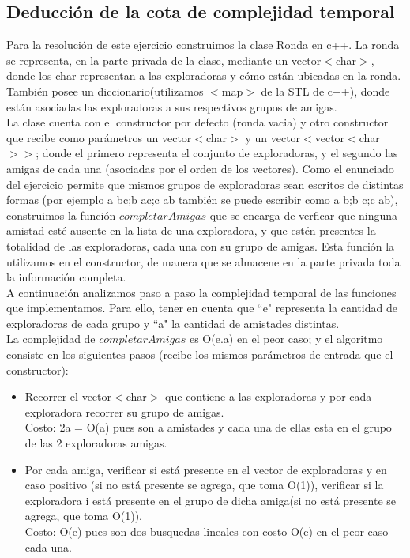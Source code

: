 \subsection{Deducción de la cota de complejidad temporal}

Para la resolución de este ejercicio construimos la clase Ronda en c++. La ronda se representa, en la parte privada de la clase,
mediante un vector$<$char$>$, donde los char representan a las exploradoras y cómo están ubicadas en la ronda. También posee un 
diccionario(utilizamos $<$map$>$ de la STL de c++), donde están asociadas las exploradoras a sus respectivos grupos de amigas. \\
La clase cuenta con el constructor por defecto (ronda vacia) y otro constructor que recibe como parámetros un vector$<$char$>$ y un
vector$<$vector$<$char$>>$; donde el primero representa el conjunto de exploradoras, y el segundo las amigas de cada una (asociadas
por el orden de los vectores). Como el enunciado del ejercicio permite que mismos grupos de exploradoras sean escritos de distintas 
formas (por ejemplo a bc;b ac;c ab también se puede escribir como a b;b c;c ab), construimos la función $completarAmigas$ que se 
encarga de verficar que ninguna amistad esté ausente en la lista de una exploradora, y que estén presentes la totalidad de las 
exploradoras, cada una con su grupo de amigas. Esta función la utilizamos en el constructor, de manera que se almacene en la parte 
privada toda la información completa. \\
A continuación analizamos paso a paso la complejidad temporal de las funciones que implementamos. Para ello, tener en cuenta que 
``e"$ $ representa la cantidad de exploradoras de cada grupo y  ``a"$ $ la cantidad de amistades distintas. \\
La complejidad de $completarAmigas$ es O(e.a) en el peor caso; y el algoritmo consiste en los siguientes pasos (recibe los mismos 
parámetros de entrada que el constructor): 
\begin{itemize}
\item Recorrer el vector$<$char$>$ que contiene a las exploradoras y por cada exploradora recorrer su grupo de amigas. \\
Costo: 2a = O(a) pues son a amistades y cada una de ellas esta en el grupo de las 2 exploradoras amigas. 
\item Por cada amiga, verificar si está presente en el vector de exploradoras y en caso positivo (si no está presente se agrega, que 
toma O(1)), verificar si la exploradora i está presente en el grupo de dicha amiga(si no está presente se agrega, que 
toma O(1)).  \\
Costo: O(e) pues son dos busquedas lineales con costo O(e) en el peor caso cada una.
\end{itemize}
